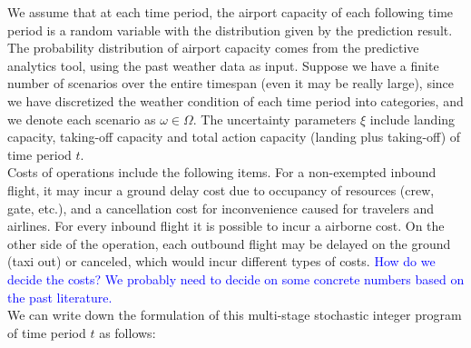 \documentclass[12pt]{article}
\begin{document}
	\newline %
	We assume that at each time period, the airport capacity of each following time period is a random variable with the distribution given by the prediction result. The probability distribution of airport capacity comes from the predictive analytics tool, using the past weather data as input. Suppose we have a finite number of scenarios over the entire timespan (even it may be really large), since we have discretized the weather condition of each time period into categories, and we denote each scenario as \(\omega \in \Omega\). The uncertainty parameters \(\xi\) include landing capacity, taking-off capacity and total action capacity (landing plus taking-off) of time period \(t\). \\
	\newline %
	Costs of operations include the following items. For a non-exempted inbound flight, it may incur a ground delay cost due to occupancy of resources (crew, gate, etc.), and a cancellation cost for inconvenience caused for travelers and airlines. For every inbound flight it is possible to incur a airborne cost. On the other side of the operation, each outbound flight may be delayed on the ground (taxi out) or canceled, which would incur different types of costs. \textcolor{blue}{How do we decide the costs? We probably need to decide on some concrete numbers based on the past literature.} \\
	\newline We can write down the formulation of this multi-stage stochastic integer program of time period \(t\) as follows:
\end{document}
